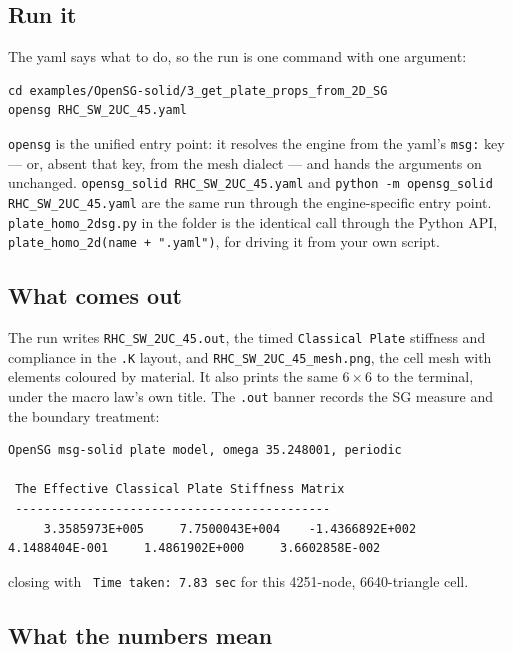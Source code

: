 \subsection{Run it}

The yaml says what to do, so the run is one command with one argument:

\begin{lstlisting}[style=shellst]
cd examples/OpenSG-solid/3_get_plate_props_from_2D_SG
opensg RHC_SW_2UC_45.yaml
\end{lstlisting}

\texttt{opensg} is the unified entry point: it resolves the engine from the
yaml's \texttt{msg:} key --- or, absent that key, from the mesh dialect --- and
hands the arguments on unchanged. \texttt{opensg\_solid RHC\_SW\_2UC\_45.yaml}
and \texttt{python -m opensg\_solid RHC\_SW\_2UC\_45.yaml} are the same run
through the engine-specific entry point.
\texttt{plate\_homo\_2dsg.py} in the folder is the identical call through the
Python API, \texttt{plate\_homo\_2d(name + ".yaml")}, for driving it from your
own script.

\subsection{What comes out}

The run writes \texttt{RHC\_SW\_2UC\_45.out}, the timed \texttt{Classical Plate}
stiffness and compliance in the \texttt{.K} layout, and
\texttt{RHC\_SW\_2UC\_45\_mesh.png}, the cell mesh with elements coloured by
material. It also prints the same $6\times6$ to the terminal, under the macro
law's own title. The \texttt{.out} banner records the SG measure and the
boundary treatment:

\begin{lstlisting}[style=shellst,basicstyle=\ttfamily\tiny]
 OpenSG msg-solid plate model, omega 35.248001, periodic

 The Effective Classical Plate Stiffness Matrix
 --------------------------------------------
     3.3585973E+005     7.7500043E+004    -1.4366892E+002     4.1488404E-001     1.4861902E+000     3.6602858E-002
\end{lstlisting}

closing with \texttt{ Time taken: 7.83 sec} for this 4251-node, 6640-triangle
cell.

\subsection{What the numbers mean}

